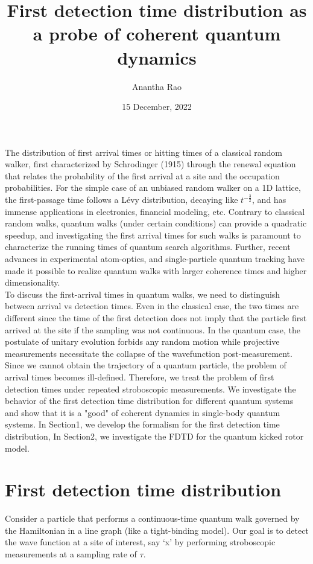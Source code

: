\documentclass{article}
\title{First detection time distribution as a probe of coherent quantum dynamics}
\date{15 December, 2022}
\author{Anantha Rao}
\begin{document}
\maketitle

The distribution of first arrival times or hitting times of a classical random walker, first characterized by Schrodinger (1915) through the renewal equation that relates the probability of the first arrival at a site and the occupation probabilities. For the simple case of an unbiased random walker on a 1D lattice, the first-passage time follows a Lévy distribution, decaying like $t^{-\frac{3}{2}}$, and has immense applications in electronics, financial modeling, etc. Contrary to classical random walks, quantum walks (under certain conditions) can provide a quadratic speedup, and investigating the first arrival times for such walks is paramount to characterize the running times of quantum search algorithms. Further, recent advances in experimental atom-optics, and single-particle quantum tracking have made it possible to realize quantum walks with larger coherence times and higher dimensionality.\\

To discuss the first-arrival times in quantum walks, we need to distinguish between arrival vs detection times. Even in the classical case, the two times are different since the time of the first detection does not imply that the particle first arrived at the site if the sampling was not continuous. In the quantum case, the postulate of unitary evolution forbids any random motion while projective measurements necessitate the collapse of the wavefunction post-measurement. Since we cannot obtain the trajectory of a quantum particle, the problem of arrival times becomes ill-defined. Therefore, we treat the problem of first detection times under repeated stroboscopic measurements. We investigate the behavior of the first detection time distribution for different quantum systems and show that it is a "good" of coherent dynamics in single-body quantum systems. In Section1, we develop the formalism for the first detection time distribution, In Section2, we investigate the FDTD for the quantum kicked rotor model.

\section{First detection time distribution}

Consider a particle that performs a continuous-time quantum walk governed by the Hamiltonian in a line graph (like a tight-binding model). Our goal is to detect the wave function at a site of interest, say `x' by performing stroboscopic measurements at a sampling rate of $\tau$.
\end{document}
